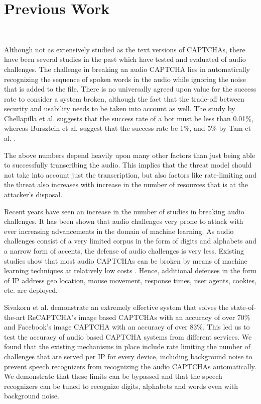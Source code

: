 

\section{Previous Work}\mbox{} \
\label{sec:previous}

Although not as extensively studied as the text versions of CAPTCHAs, there have been several studies in the past which have tested and evaluated of audio challenges. The challenge in breaking an audio CAPTCHA lies in automatically recognizing the sequence of spoken words in the audio while ignoring the noise that is added to the file. There is no universally agreed upon value for the success rate to consider a system broken, although the fact that the trade-off between security and usability needs to be taken into account as well. The study by Chellapilla et al. \cite{chellapilla2005designing} suggests that the success rate of a bot must be less than 0.01\%, whereas Bursztein et al. \cite{bursztein2011failure} suggest that the success rate be 1\%, and 5\% by Tam et al. \cite{meutzner2016toward}. \newline

The above numbers depend heavily upon many other factors than just being able to successfully transcribing the audio. This implies that the threat model should not take into account just the transcription, but also factors like rate-limiting and the threat also increases with increase in the number of resources that is at the attacker's disposal. \newline

Recent years have seen an increase in the number of studies in breaking audio challenges. It has been shown that audio challenges very prone to attack with ever increasing advancements in the domain of machine learning. As audio challenges consist of a very limited corpus in the form of digits and alphabets and a narrow form of accents, the defense of audio challenges is very less. Existing studies show that most audio CAPTCHAs can be broken by means of machine learning techniques at relatively low costs \cite{bursztein2011failure,meutzner2016toward,bursztein2009decaptcha}. Hence, additional defenses in the form of IP address geo location, mouse movement, response times, user agents, cookies, etc. are deployed. \newline

Sivakorn et al. \cite{sivakorn2016robot} demonstrate an extremely effective system that solves the state-of-the-art ReCAPTCHA's image based CAPTCHAs with an accuracy of over 70\% and Facebook's image CAPTCHA with an accuracy of over 83\%. This led us to test the accuracy of audio based CAPTCHA systems from different services. We found that the existing mechanisms in place include rate limiting the number of challenges that are served per IP for every device, including background noise to prevent speech recognizers from recognizing the audio CAPTCHAs automatically. We demonstrate that these limits can be bypassed and that the speech recognizers can be tuned to recognize digits, alphabets and words even with background noise.\newline

